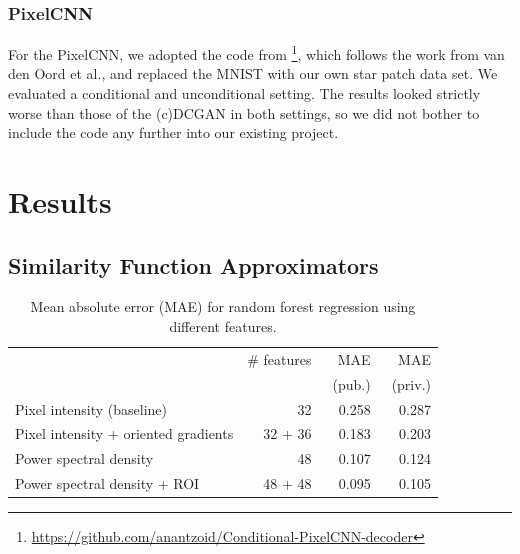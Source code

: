 \documentclass[10pt,conference,compsocconf]{IEEEtran}
\begin{document}
\subsubsection{PixelCNN}
For the PixelCNN, we adopted the code from \footnote{\url{https://github.com/anantzoid/Conditional-PixelCNN-decoder}}, which follows the work from van den Oord et al.\@ \cite{PixelCNN}, and replaced the MNIST with our own star patch data set. We evaluated a conditional and unconditional setting. The results looked strictly worse than those of the (c)DCGAN in both settings, so we did not bother to include the code any further into our existing project.



\section{Results}
\label{sec:results}
\subsection{Similarity Function Approximators}


    

\begin{table}\centering
\begin{tabular}{lrrr}
\toprule
& \# features & MAE & MAE \\
& & ~(pub.) & ~(priv.) \\
\midrule
Pixel intensity (baseline) & 32 & 0.258 & 0.287  \\
Pixel intensity + oriented gradients & 32 + 36 & 0.183 & 0.203 \\
Power spectral density & 48 & 0.107 & 0.124 \\
Power spectral density + ROI & 48 + 48 & 0.095 & 0.105 \\
\bottomrule
\end{tabular}
\caption{Mean absolute error (MAE) for random forest regression using different features.}\label{tab:RF}
\end{table}
\end{document}
